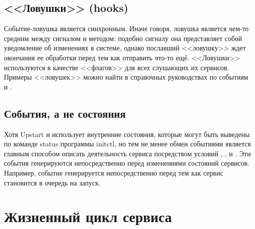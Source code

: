 \subsection*{<<Ловушки>> (hooks)}
Событие-ловушка является синхронным. Иначе говоря, ловушка является чем-то средним между сигналом и методом: подобно сигналу она представляет собой уведомление об изменениях в системе, однако пославший <<ловушку>> ждет окончания ее обработки перед тем как отправить что-то ещё. <<Ловушки>> используются в качестве <<флагов>> для всех слушающих их сервисов. Примеры <<ловушек>> можно найти в справочных руководствах по событиям  и . 
\subsection*{События, а не состояния}
Хотя Upstart и использует внутренние состояния, которые могут быть выведены по команде status программы initctl,  но тем не менее обмен событиями является главным способом описать деятельность сервиса посредством условий , ,  и . Эти события 
генерируются непосредственно перед изменениями состояний сервисов. Например, событие  генерируется непосредственно перед тем как сервис становится в очередь на запуск.
\section{Жизненный цикл сервиса}
